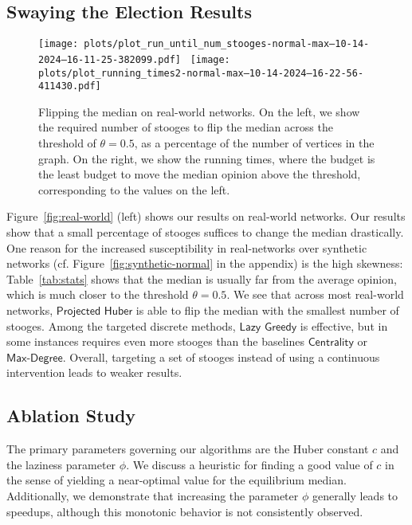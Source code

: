 \subsection{Swaying the Election Results}

\begin{figure}
    \centering
    \texttt{[image: plots/plot\_run\_until\_num\_stooges-normal-max--10-14-2024--16-11-25-382099.pdf]}~
    \texttt{[image: plots/plot\_running\_times2-normal-max--10-14-2024--16-22-56-411430.pdf]}
    \figsp
    \caption{Flipping the median on real-world networks. 
    On the left,
    we show the required number of stooges to flip the median across the
    threshold of $\theta=0.5$, as a percentage of the
    number of vertices in the graph.
    On the right, we show the running times, where the budget
    is the least budget to move the median opinion above
    the threshold, corresponding to the values on the left.
    }
    \label{fig:real-world}
    \label{fig:scalability}
\end{figure}


Figure~\ref{fig:real-world} (left) shows
our results on real-world networks.
Our results show that a
small percentage of stooges suffices
to change the median drastically.
One reason for the increased
susceptibility in real-networks
over synthetic networks (cf. Figure~\ref{fig:synthetic-normal}
in the appendix) is the
high skewness: Table~\ref{tab:stats}
shows that the median is usually
far from the average opinion,
which is much closer to the 
threshold $\theta=0.5$.
We see that across most
real-world networks,
$\textsf{Projected Huber}$ is
able to flip the median
with the smallest number of stooges.  Among the targeted discrete methods, $\textsf{Lazy Greedy}$
is effective, but in some
instances requires even more
stooges than the baselines
$\textsf{Centrality}$ or
$\textsf{Max-Degree}$.
Overall, targeting a set of stooges
instead of using a continuous intervention
leads to weaker results.


\subsection{Ablation Study}
\label{subsec:ablation}

The primary parameters governing our algorithms are the Huber constant $c$ and the laziness parameter $\phi$. We discuss a heuristic for finding a good value of $c$ in the sense of yielding a near-optimal value for the equilibrium median. Additionally, we demonstrate that increasing the parameter $\phi$ generally leads to speedups, although this monotonic behavior is not consistently observed.


